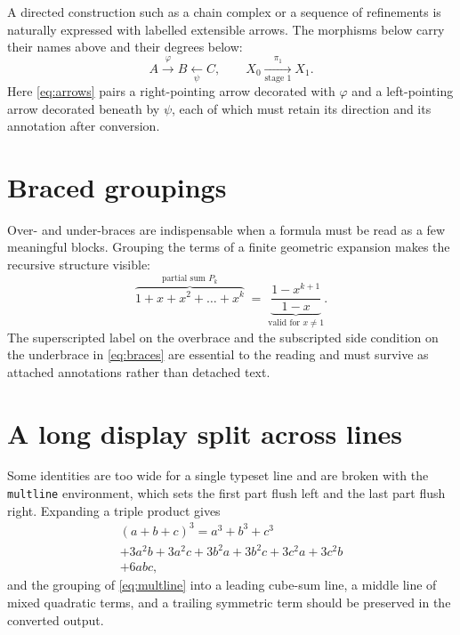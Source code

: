 \documentclass[11pt]{article}
\begin{document}
A directed construction such as a chain complex or a sequence of refinements is
naturally expressed with labelled extensible arrows. The morphisms below carry
their names above and their degrees below:
\begin{equation}
\label{eq:arrows}
A \xrightarrow{\;\varphi\;} B \xleftarrow[\psi]{\quad} C,
\qquad
X_0 \xrightarrow[\text{stage } 1]{\;\pi_1\;} X_1 .
\end{equation}
Here \cref{eq:arrows} pairs a right-pointing arrow decorated with $\varphi$ and a
left-pointing arrow decorated beneath by $\psi$, each of which must retain its
direction and its annotation after conversion.

\section{Braced groupings}
\label{sec:braces}

Over- and under-braces are indispensable when a formula must be read as a few
meaningful blocks. Grouping the terms of a finite geometric expansion makes the
recursive structure visible:
\begin{equation}
\label{eq:braces}
\overbrace{1 + x + x^{2} + \dots + x^{k}}^{\text{partial sum } P_k}
\;=\;
\underbrace{\frac{1 - x^{k+1}}{1 - x}}_{\text{valid for } x \neq 1}.
\end{equation}
The superscripted label on the overbrace and the subscripted side condition on
the underbrace in \cref{eq:braces} are essential to the reading and must survive
as attached annotations rather than detached text.

\section{A long display split across lines}
\label{sec:multline}

Some identities are too wide for a single typeset line and are broken with the
\texttt{multline} environment, which sets the first part flush left and the last
part flush right. Expanding a triple product gives
\begin{multline}
\label{eq:multline}
(a + b + c)^{3}
= a^{3} + b^{3} + c^{3} \\
+ 3a^{2}b + 3a^{2}c + 3b^{2}a + 3b^{2}c + 3c^{2}a + 3c^{2}b \\
+ 6abc ,
\end{multline}
and the grouping of \cref{eq:multline} into a leading cube-sum line, a middle
line of mixed quadratic terms, and a trailing symmetric term should be preserved
in the converted output.
\end{document}
